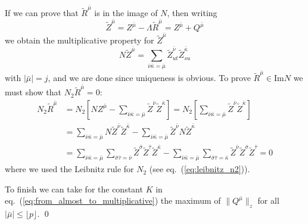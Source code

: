 \documentclass[a4paper,12pt,reqno]{amsproc}
\newcommand{\NN}{N}
\begin{document}
If we can prove that $\widetilde R^{\bar\mu}$ is in the image of
$\NN$, then writing 
$$
\widetilde Z^{\bar\mu}  = Z^{\bar\mu} - \Lambda \widetilde R^{\bar\mu}
= Z^{\bar\mu} + Q^{\bar\mu}
$$
we obtain the multiplicative property for $\widetilde Z^{\bar\mu}$
$$
\NN \widetilde Z^{\bar\mu}  = \sum_{\bar\nu \bar\kappa = \bar\mu}
\widetilde Z^{\bar\nu}_{ut} \widetilde
Z^{\bar\kappa}_{su}
$$
with $|\bar\mu| = j$, and we are done since uniqueness is obvious.
To prove $\widetilde R^{\bar\mu} \in \text{Im}\NN$ we must show that 
$\NN_2 \widetilde R^{\bar\mu} = 0$: 
\begin{equation*}
  \begin{split}
\NN_2 \widetilde R^{\bar\mu} & = 
\NN_2 \left[ \NN Z^{\bar \mu}-\sum_{\bar\nu \bar\kappa = \bar\mu}
\widetilde Z^{\bar\nu} \widetilde
Z^{\bar\kappa}\right]
 = 
N_2    \left[\sum_{\bar\nu \bar\kappa = \bar\mu}
\widetilde Z^{\bar\nu} \widetilde
Z^{\bar\kappa}\right]
\\ & = \sum_{\bar\nu \bar\kappa =
\bar\mu} N  \widetilde Z^{\bar\nu} \widetilde
Z^{\bar\kappa} - \sum_{\bar\nu \bar\kappa =
\bar\mu}  \widetilde Z^{\bar\nu} N \widetilde
Z^{\bar\kappa}
\\ & =     
\sum_{\bar\nu \bar\kappa =
\bar\mu} \sum_{\bar\sigma\bar\tau = \bar\nu} \widetilde Z^{\bar\sigma} \widetilde Z^{\bar\tau}\widetilde
Z^{\bar\kappa} - \sum_{\bar\nu \bar\kappa =
\bar\mu} \sum_{\bar\sigma\bar\tau = \bar\kappa} \widetilde
Z^{\bar\nu} \widetilde Z^{\bar\sigma} \widetilde
Z^{\bar\tau}   = 0
  \end{split}
\end{equation*}
where we used the  Leibnitz rule for $N_2$
(see eq.~(\ref{eq:leibnitz_n2})).

To finish we can take for the constant $K$ in
 eq.~(\ref{eq:from_almost_to_multiplicative}) the maximum of
 $\|Q^{\bar\mu}\|_z$ for all $|\bar\mu| \le \lfloor p \rfloor$. 
 \qed
\end{document}
